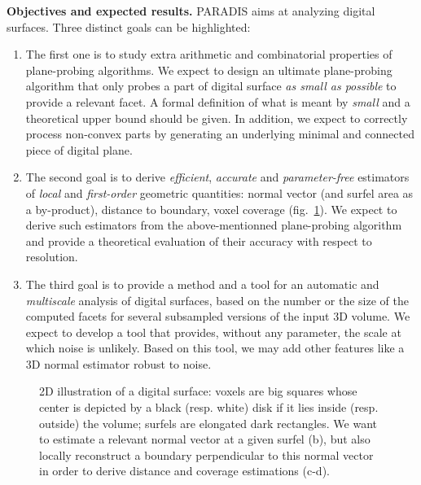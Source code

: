 \noindent\textbf{Objectives and expected results.}
PARADIS aims at analyzing digital surfaces. Three distinct goals can be highlighted:
\begin{enumerate}[label=(G\arabic*)]
  \item %
The first one is to study extra arithmetic and combinatorial properties
of plane-probing algorithms. We expect to design an ultimate plane-probing algorithm that
only probes a part of digital surface \emph{as small as possible} to provide a relevant facet.
A formal definition of what is meant by \emph{small} and a theoretical upper bound should be given.
In addition, we expect to correctly process non-convex parts by generating an underlying
minimal and connected piece of digital plane.  \label{goalppa} 
 \item %
The second goal is to derive \emph{efficient}, \emph{accurate} and \emph{parameter-free} estimators
of \emph{local} and \emph{first-order} geometric quantities: normal vector (and surfel area as a by-product),
distance to boundary, voxel coverage (fig.~\ref{fig:2D}). We expect to derive such estimators from
the above-mentionned plane-probing algorithm and provide a theoretical evaluation of their accuracy
with respect to resolution. \label{goalestim}  
 \item %
The third goal is to provide a method and a tool for an automatic and \emph{multiscale} analysis of digital surfaces,
based on the number or the size of the computed facets for several subsampled versions of the input 3D volume. 
We expect to develop a tool that provides, without any parameter, the scale at which noise is unlikely. Based on
this tool, we may add other features like a 3D normal estimator robust to noise.  \label{goalscale}
\end{enumerate}

\begin{figure}[hbt]
  \centering
{} \hspace{0.05\textwidth}
 \hspace{0.05\textwidth}
 \hspace{0.05\textwidth}
 \caption{2D illustration of a digital surface: voxels are big squares whose center is depicted by a black (resp. white) disk if it lies inside (resp. outside) the volume; surfels are elongated dark rectangles. We want to estimate a relevant normal vector at a given surfel (b), but also locally reconstruct a boundary perpendicular to this normal vector in order to derive distance and coverage estimations (c-d).} 
\label{fig:2D} 
\end{figure}

